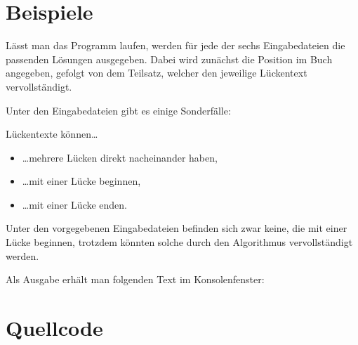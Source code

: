 \documentclass[a4paper,10pt,ngerman]{scrartcl}
\begin{document}
	\section{Beispiele}\label{sec:beispiele}
		Lässt man das Programm laufen, werden für jede der sechs Eingabedateien die passenden Lösungen ausgegeben.
		Dabei wird zunächst die Position im Buch angegeben, gefolgt von dem Teilsatz, welcher den jeweilige Lückentext vervollständigt.
		
		Unter den Eingabedateien gibt es einige Sonderfälle:

		Lückentexte können\ldots
		\begin{itemize}
			\item \ldots mehrere Lücken direkt nacheinander haben,
			\item \ldots mit einer Lücke beginnen,
			\item \ldots mit einer Lücke enden.
		\end{itemize}
		Unter den vorgegebenen Eingabedateien befinden sich zwar keine, die mit einer Lücke beginnen, trotzdem könnten solche durch den Algorithmus vervollständigt werden.
		
		Als Ausgabe erhält man folgenden Text im Konsolenfenster:

	\section{Quellcode}\label{sec:quellcode}
   
\end{document}

